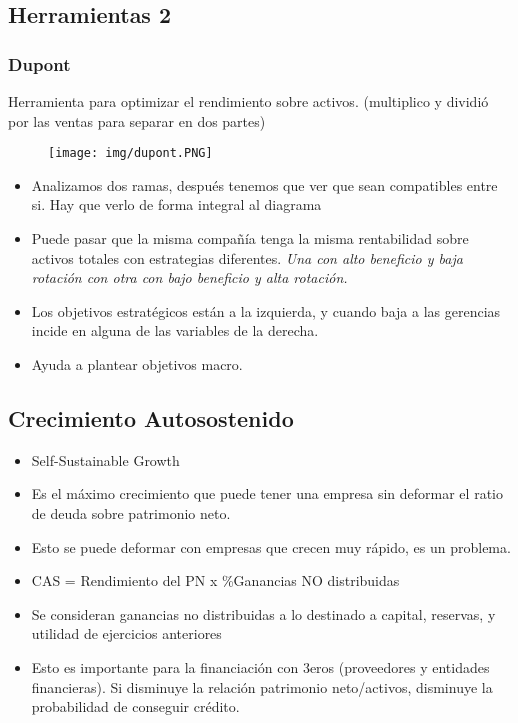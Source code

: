 \documentclass[titlepage,a4paper]{article}
\begin{document}
\subsection{Herramientas 2}
\subsubsection*{Dupont}
Herramienta para optimizar el rendimiento sobre activos. (multiplico y dividió por las ventas para separar en dos partes)

\begin{figure}[!htb]
    \centering
    \texttt{[image: img/dupont.PNG]}
\end{figure}


\begin{itemize}
    \item Analizamos dos ramas, después tenemos que ver que sean compatibles entre si. Hay que verlo de forma integral al diagrama
    \item Puede pasar que la misma compañía tenga la misma rentabilidad sobre activos totales con estrategias diferentes. \textit{Una con alto beneficio y baja rotación con otra con bajo beneficio y alta rotación.}
    \item Los objetivos estratégicos están a la izquierda, y cuando baja a las gerencias incide en alguna de las variables de la derecha.
\item Ayuda a plantear objetivos macro.
\end{itemize}


\subsection{Crecimiento Autosostenido}
\begin{itemize}
    \item Self-Sustainable Growth
\item Es el máximo crecimiento que puede tener una empresa sin deformar el ratio de deuda sobre patrimonio neto.
    \item Esto se puede deformar con empresas que crecen muy rápido, es un problema.
    \item CAS = Rendimiento del PN x \%Ganancias NO distribuidas
    \item Se consideran ganancias no distribuidas a lo destinado a capital, reservas, y utilidad de ejercicios anteriores
    \item Esto es importante para la financiación con 3eros (proveedores y entidades financieras). Si disminuye la relación patrimonio neto/activos, disminuye la probabilidad de conseguir crédito.
\end{itemize}
\end{document}
